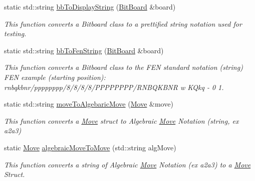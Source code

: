 \begin{DoxyCompactItemize}
\item 
\mbox{\label{classBoardConversions_aef2786eee5b3d96aa23aa9ca2b38f693}} 
static std\+::string \hyperlink{classBoardConversions_aef2786eee5b3d96aa23aa9ca2b38f693}{bb\+To\+Display\+String} (\hyperlink{classBitBoard}{Bit\+Board} \&board)
\begin{DoxyCompactList}\small\item\em This function converts a Bitboard class to a prettified string notation used for testing. \end{DoxyCompactList}\item 
\mbox{\label{classBoardConversions_a6fb57142a68ffbc456ad518778e299e3}} 
static std\+::string \hyperlink{classBoardConversions_a6fb57142a68ffbc456ad518778e299e3}{bb\+To\+Fen\+String} (\hyperlink{classBitBoard}{Bit\+Board} \&board)
\begin{DoxyCompactList}\small\item\em This function converts a Bitboard class to the F\+EN standard notation (string) F\+EN example (starting position)\+: rnbqkbnr/pppppppp/8/8/8/8/\+P\+P\+P\+P\+P\+P\+P\+P/\+R\+N\+B\+Q\+K\+B\+NR w K\+Qkq -\/ 0 1. \end{DoxyCompactList}\item 
\mbox{\label{classBoardConversions_ae16a4fe316818ea8a006d7050f37701c}} 
static std\+::string \hyperlink{classBoardConversions_ae16a4fe316818ea8a006d7050f37701c}{move\+To\+Algebaric\+Move} (\hyperlink{structMove}{Move} \&move)
\begin{DoxyCompactList}\small\item\em This function converts a \hyperlink{structMove}{Move} struct to Algebraic \hyperlink{structMove}{Move} Notation (string, ex \textquotesingle{}a2a3\textquotesingle{}) \end{DoxyCompactList}\item 
\mbox{\label{classBoardConversions_a1db0f37732123cb9d104d83c398e51b0}} 
static \hyperlink{structMove}{Move} \hyperlink{classBoardConversions_a1db0f37732123cb9d104d83c398e51b0}{algebraic\+Move\+To\+Move} (std\+::string alg\+Move)
\begin{DoxyCompactList}\small\item\em This function converts a string of Algebraic \hyperlink{structMove}{Move} Notation (ex \textquotesingle{}a2a3\textquotesingle{}) to a \hyperlink{structMove}{Move} Struct. \end{DoxyCompactList}\end{DoxyCompactItemize}


